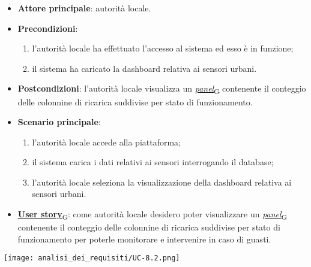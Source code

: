 \begin{itemize}
	\item \textbf{Attore principale}: autorità locale.
	\item \textbf{Precondizioni}:
	      \begin{enumerate}
		      \item l'autorità locale ha effettuato l'accesso al sistema ed esso è in funzione;
		      \item il sistema ha caricato la dashboard relativa ai sensori urbani.
	      \end{enumerate}
	\item \textbf{Postcondizioni}: l'autorità locale visualizza un \href{https://7last.github.io/docs/rtb/documentazione-interna/glossario\#panel}{\textit{panel}\textsubscript{G}} contenente il conteggio delle colonnine di ricarica suddivise per stato di funzionamento.
	\item \textbf{Scenario principale}:
	      \begin{enumerate}
		      \item l'autorità locale accede alla piattaforma;
		      \item il sistema carica i dati relativi ai sensori interrogando il database;
		      \item l'autorità locale seleziona la visualizzazione della dashboard relativa ai sensori urbani.
	      \end{enumerate}
	\item \href{https://7last.github.io/docs/rtb/documentazione-interna/glossario\#user-story}{\textbf{User story}\textsubscript{G}}:
	      come autorità locale desidero poter visualizzare un \href{https://7last.github.io/docs/rtb/documentazione-interna/glossario\#panel}{\textit{panel}\textsubscript{G}} contenente il conteggio delle colonnine di ricarica suddivise per stato di funzionamento
	      per poterle monitorare e intervenire in caso di guasti.
\end{itemize}
\begin{center}
	\texttt{[image: analisi\_dei\_requisiti/UC-8.2.png]}
\end{center}

